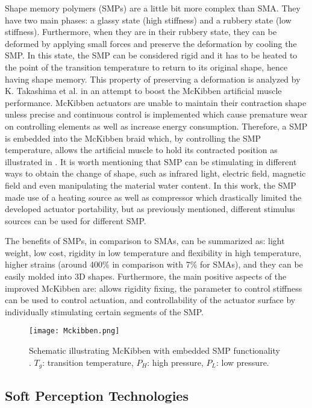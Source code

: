 Shape memory polymers (SMPs) are a little bit more complex than SMA. They have two main phases: a glassy state (high stiffness) and a rubbery state (low stiffness). Furthermore, when they are in their rubbery state, they can be deformed by applying small forces and preserve the deformation by cooling the SMP. In this state, the SMP can be considered rigid and it has to be heated to the point of the transition temperature to return to its original shape, hence having shape memory. This property of preserving a deformation is analyzed by K. Takashima et al. \cite{Takashima2010} in an attempt to boost the McKibben artificial muscle performance. McKibben actuators are unable to maintain their contraction shape unless precise and continuous control is implemented which cause premature wear on controlling elements as well as increase energy consumption. Therefore, a SMP is embedded into the McKibben braid which, by controlling the SMP temperature, allows the artificial muscle to hold its contracted position as illustrated in . It is worth mentioning that SMP can be stimulating in different ways to obtain the change of shape, such as infrared light, electric field, magnetic field and even manipulating the material water content. In this work, the SMP made use of a heating source as well as compressor which drastically limited the developed actuator portability, but as previously mentioned, different stimulus sources can be used for different SMP.

The benefits of SMPs, in comparison to SMAs, can be summarized as: light weight, low cost, rigidity in low temperature and flexibility in high temperature, higher strains (around 400\% in comparison with 7\% for SMAs), and they can be easily molded into 3D shapes. Furthermore, the main positive aspects of the improved McKibben are: allows rigidity fixing, the parameter to control stiffness can be used to control actuation, and controllability of the actuator surface by individually stimulating certain segments of the SMP.

\begin{figure}[hbtp!]
    \centering
    \texttt{[image: Mckibben.png]}
    \caption{Schematic illustrating McKibben with embedded SMP functionality \cite{Takashima2010}. $T_g$: transition temperature, $P_H$: high pressure, $P_L$: low pressure. }
    \label{fig:mckibben}
\end{figure}

\subsection{Soft Perception Technologies}
